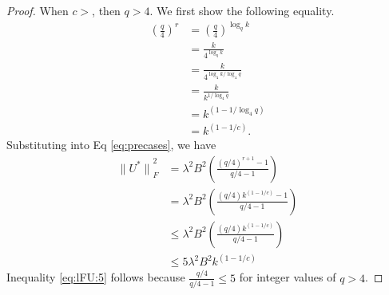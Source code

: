 \documentclass[twoside]{article}
\newtheorem{lemma}{Lemma}
\renewcommand{\star}[1]{{#1}^{*}}
\newcommand{\lF}[1]{{\lVert {#1} \rVert}_F}
\begin{document}
{\begin{proof}
When $c>$, then $q>4$.
We first show the following equality.
\begin{align}
\left(\frac q 4\right)^r
&=
\left(\frac q 4\right)^{\log_q k}\\
&=
\frac{k}{4^{\log_q k}}\\
&=
\frac{k}{4^{{\log_4 k}/{\log_4 q}}}\\
&=
\frac{k}{k^{1/\log_4 q}}\\
&=
k^{\left(1 - {1}/{\log_4 q}\right)} \\
&=
k^{\left(1 - 1/c\right)}
.
\label{eq:lFU:frac}
\end{align}
Substituting into Eq \eqref{eq:precases}, we have
\begin{align}
    \lF{\star U}^2
    &= \lambda^2B^2 \left(\frac{(q/4)^{r+1}-1}{q/4-1}\right) \\
    \label{eq:lFU:4}
    &= \lambda^2B^2 \left(\frac{(q/4)k^{(1-1/c)}-1}{q/4-1}\right) \\
    &\le \lambda^2B^2 \left(\frac{(q/4)k^{(1-1/c)}}{q/4-1}\right) \\
    &\le 5 \lambda^2B^2 k^{(1-1/c)}
    \label{eq:lFU:5}
\end{align}
    Inequality \eqref{eq:lFU:5} follows because $\tfrac{q/4}{q/4-1} \le 5$ for integer values of $q>4$.
\end{proof}
}


\end{document}
